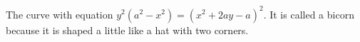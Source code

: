 The curve with equation $y^{2}(a^{2}-x^{2})=(x^{2}+2ay-a)^{2}.$ 
It is called a bicorn because it is shaped a little like a hat with two
corners.